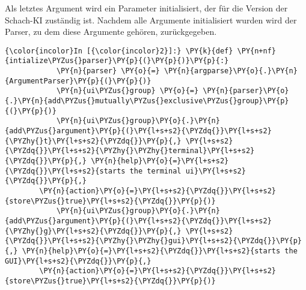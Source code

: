 Als letztes Argument wird ein Parameter initialisiert, der für die
Version der Schach-KI zuständig ist. Nachdem alle Argumente
initialisiert wurden wird der Parser, zu dem diese Argumente gehören,
zurückgegeben.

    \begin{Verbatim}[commandchars=\\\{\}]
{\color{incolor}In [{\color{incolor}2}]:} \PY{k}{def} \PY{n+nf}{intialize\PYZus{}parser}\PY{p}{(}\PY{p}{)}\PY{p}{:}
            \PY{n}{parser} \PY{o}{=} \PY{n}{argparse}\PY{o}{.}\PY{n}{ArgumentParser}\PY{p}{(}\PY{p}{)}
            \PY{n}{ui\PYZus{}group} \PY{o}{=} \PY{n}{parser}\PY{o}{.}\PY{n}{add\PYZus{}mutually\PYZus{}exclusive\PYZus{}group}\PY{p}{(}\PY{p}{)}
            \PY{n}{ui\PYZus{}group}\PY{o}{.}\PY{n}{add\PYZus{}argument}\PY{p}{(}\PY{l+s+s2}{\PYZdq{}}\PY{l+s+s2}{\PYZhy{}t}\PY{l+s+s2}{\PYZdq{}}\PY{p}{,} \PY{l+s+s2}{\PYZdq{}}\PY{l+s+s2}{\PYZhy{}\PYZhy{}terminal}\PY{l+s+s2}{\PYZdq{}}\PY{p}{,} \PY{n}{help}\PY{o}{=}\PY{l+s+s2}{\PYZdq{}}\PY{l+s+s2}{starts the terminal ui}\PY{l+s+s2}{\PYZdq{}}\PY{p}{,} 
		\PY{n}{action}\PY{o}{=}\PY{l+s+s2}{\PYZdq{}}\PY{l+s+s2}{store\PYZus{}true}\PY{l+s+s2}{\PYZdq{}}\PY{p}{)}
            \PY{n}{ui\PYZus{}group}\PY{o}{.}\PY{n}{add\PYZus{}argument}\PY{p}{(}\PY{l+s+s2}{\PYZdq{}}\PY{l+s+s2}{\PYZhy{}g}\PY{l+s+s2}{\PYZdq{}}\PY{p}{,} \PY{l+s+s2}{\PYZdq{}}\PY{l+s+s2}{\PYZhy{}\PYZhy{}gui}\PY{l+s+s2}{\PYZdq{}}\PY{p}{,} \PY{n}{help}\PY{o}{=}\PY{l+s+s2}{\PYZdq{}}\PY{l+s+s2}{starts the GUI}\PY{l+s+s2}{\PYZdq{}}\PY{p}{,} 
		\PY{n}{action}\PY{o}{=}\PY{l+s+s2}{\PYZdq{}}\PY{l+s+s2}{store\PYZus{}true}\PY{l+s+s2}{\PYZdq{}}\PY{p}{)}
        

\end{Verbatim}
